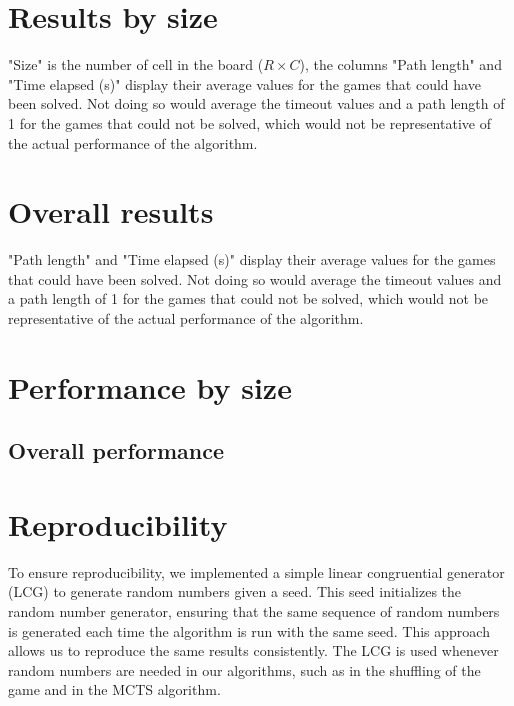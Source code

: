 \section{Results by size}
\begin{table}[H]
\centering

\caption{"Size" is the number of cell in the board ($R \times C$), the columns "Path length" and "Time elapsed (s)" display their average values for the games that could have been solved. Not doing so would average the timeout values and a path length of 1 for the games that could not be solved, which would not be representative of the actual performance of the algorithm.}
\end{table}

\section{Overall results}
\begin{table}[H]
  \centering
  
  \caption{"Path length" and "Time elapsed (s)" display their average values for the games that could have been solved. Not doing so would average the timeout values and a path length of 1 for the games that could not be solved, which would not be representative of the actual performance of the algorithm.}
\end{table}

\newpage
\section{Performance by size}

\newpage
\subsection{Overall performance}

\section{Reproducibility}
To ensure reproducibility, we implemented a simple linear congruential generator (LCG) to generate random numbers given a seed. This seed initializes the random number generator, ensuring that the same sequence of random numbers is generated each time the algorithm is run with the same seed. This approach allows us to reproduce the same results consistently. The LCG is used whenever random numbers are needed in our algorithms, such as in the shuffling of the game and in the MCTS algorithm.

